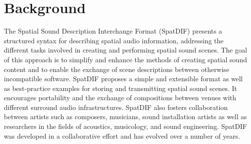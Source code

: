 \documentclass{article}
\title{\papertitle}
\begin{document}
\capstartfalse
\maketitle
\capstarttrue

\begin{abstract}
The development of SpatDIF, the Spatial Sound Description Interchange Format, continues with the implementation of concrete software tools.
In order to make SpatDIF usable in audio workflows, two types of code implementations are developed.
The first is the C/C++ software library `libspatdif', whose purpose is to provide a reference implementation of SpatDIF.
The class structure of this library and its main components embodies the principles derived from the concepts and specification of SpatDIF.
The second type of tool are specific implementations in audio programming environments, which demonstrate the methods and best-use practices for working with SpatDIF.
Two practical scenarios demonstrates the use of an external in MaxMSP and Pure Data as well as the implementation of the same example in C++.
A short-term goal is the complete implementation of the existing specification within the library. 
A long-term perspective is to develop additional extensions that will further increase the utility of the SpatDIF format.

\end{abstract}


\section{Background}\label{sec:background}

The Spatial Sound Description Interchange Format (SpatDIF) presents a structured syntax for describing spatial audio information, addressing the different tasks involved in creating and performing spatial sound scenes.
The goal of this approach is to simplify and enhance the methods of creating spatial sound content and to enable the exchange of scene descriptions between otherwise incompatible software. 
SpatDIF proposes a simple and extensible format as well as best-practice examples for storing and transmitting spatial sound scenes. 
It encourages portability and the exchange of compositions between venues with different surround audio infrastructures. 
SpatDIF also fosters collaboration between artists such as composers, musicians, sound installation artists as well as researchers in the fields of acoustics, musicology, and sound engineering.
SpatDIF was developed in a collaborative effort and has evolved over a number of years.
\end{document}

